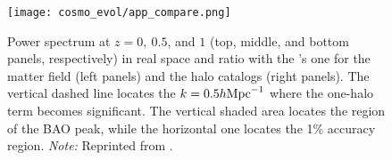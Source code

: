 \begin{figure}[!htb]
    \centering
    \texttt{[image: cosmo\_evol/app\_compare.png]}
    \caption{Power spectrum at $z = 0,\ 0.5$, and $1$ (top, middle, and bottom panels, respectively) in real space and ratio with the \nbody’s one for the matter field (left panels) and the halo catalogs (right panels). The vertical dashed line locates the $k = 0.5h\text{Mpc}^{-1}$ where the one-halo term becomes significant. The vertical shaded area locates the region of the BAO peak, while the horizontal one locates the 1\% accuracy region.  \textit{Note:} Reprinted from \textcite{2017JCAP...07..050M}.}
    \label{fig:app_compare}
\end{figure}
